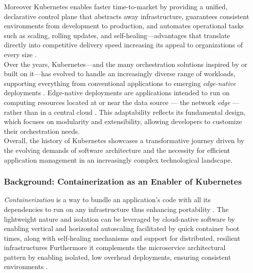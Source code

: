 \documentclass[11pt, a4paper, oneside, listof=totoc]{scrartcl}
\begin{document}
                Moreover Kubernetes enables faster time-to-market by providing a unified,
                declarative control plane that abstracts away infrastructure,
                guarantees consistent environments from development to production,
                and automates operational tasks such as scaling, rolling updates,
                and self-healing—advantages that translate directly into competitive delivery speed
                increasing its appeal to organizations of every size
                \parencite[pp.~858--859]{damarapati2025}.
                \\
                Over the years, Kubernetes—and the many orchestration solutions inspired by or built
                on it—has evolved to handle an increasingly diverse range of workloads,
                supporting everything from conventional applications to emerging
                \textit{edge-native} deployments \parencites[p.~21]{biot2025}[pp.~1--4]{biot2025}.
                Edge-native deployments are applications intended to run on computing
                resources located at or near the data source --- the network \textit{edge} ---
                rather than in a central cloud \parencite[p.~34]{satyanarayanan2019}.
                This adaptability reflects its fundamental design, which focuses on modularity and
                extensibility, allowing developers to customize their orchestration needs.
                \\
                Overall, the history of Kubernetes showcases a transformative journey driven by the
                evolving demands of software architecture and the necessity for efficient
                application management in an increasingly complex technological landscape.

            \subsubsection{Background: Containerization as an Enabler of Kubernetes}\label{subsubsec:containerization}
                \textit{Containerization} is a way to bundle an application's code with all its
                dependencies to run on any infrastructure thus enhancing portability
                \parencite{awsWhatIsContainerization,dockerWhatContainer}.
                The lightweight nature and isolation can be leveraged by cloud-native software by
                enabling vertical and horizontal autoscaling facilitated by quick container boot
                times, along with self-healing mechanisms and support for distributed, resilient
                infrastructures \parencites{kubernetesAutoscalingWorkloads}{kubernetesSelfHealing}
                    {awsWhatIsContainerization}[pp.~58--59]{davis2019}
                Furthermore it complements the microservice architectural pattern by enabling
                isolated, low overhead deployments, ensuring consistent environments
                \parencite[p.~209]{balalaie2016}.
\end{document}
